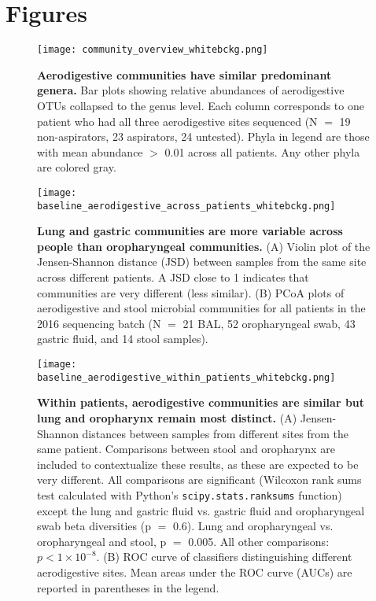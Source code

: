 
\section{Figures}

\begin{figure}[h]
        \begin{center}
        \texttt{[image: community\_overview\_whitebckg.png]}
        \caption{\textbf{Aerodigestive communities have similar predominant genera.} Bar plots showing relative abundances of aerodigestive OTUs collapsed to the genus level. Each column corresponds to one patient who had all three aerodigestive sites sequenced (N $=$ 19 non-aspirators, 23 aspirators, 24 untested). Phyla in legend are those with mean abundance $>$ 0.01 across all patients. Any other phyla are colored gray.}
        \label{fig:overview_plots}
        \end{center}
\end{figure}

\begin{figure}[h]
        \begin{center}
        \texttt{[image: baseline\_aerodigestive\_across\_patients\_whitebckg.png]}
        \caption{\textbf{Lung and gastric communities are more variable across people than oropharyngeal communities.} (A) Violin plot of the Jensen-Shannon distance (JSD) between samples from the same site across different patients. A JSD close to 1 indicates that communities are very different (less similar). (B) PCoA plots of aerodigestive and stool microbial communities for all patients in the 2016 sequencing batch (N $=$ 21 BAL, 52 oropharyngeal swab, 43 gastric fluid, and 14 stool samples).}
        \label{fig:across_people}
        \end{center}
\end{figure}

\begin{figure}[h]
        \begin{center}
        \texttt{[image: baseline\_aerodigestive\_within\_patients\_whitebckg.png]}
        \caption{\textbf{Within patients, aerodigestive communities are similar but lung and oropharynx remain most distinct.} (A) Jensen-Shannon distances between samples from different sites from the same patient. Comparisons between stool and oropharynx are included to contextualize these results, as these are expected to be very different. All comparisons are significant (Wilcoxon rank sums test calculated with Python's \texttt{scipy.stats.ranksums} function) except the lung and gastric fluid vs. gastric fluid and oropharyngeal swab beta diversities (p $=$ 0.6). Lung and oropharyngeal vs. oropharyngeal and stool, p $=$ 0.005. All other comparisons:  $p < 1 \times 10^{-8}$. (B) ROC curve of classifiers distinguishing different aerodigestive sites. Mean areas under the ROC curve (AUCs) are reported in parentheses in the legend.}
        \label{fig:within_patients}
        \end{center}
\end{figure}

